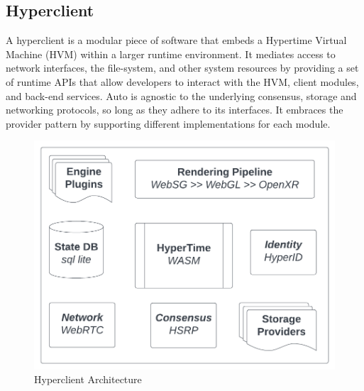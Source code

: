 \documentclass[twocolumn, 10pt]{article}
\begin{document}
\subsection{Hyperclient}

A hyperclient is a modular piece of software that embeds a Hypertime Virtual Machine (HVM) within a larger runtime environment. It mediates access to network interfaces, the file-system, and other system resources by providing a set of runtime APIs that allow developers to interact with the HVM, client modules, and back-end services. Auto is agnostic to the underlying consensus, storage and networking protocols, so long as they adhere to its interfaces. It embraces the provider pattern by supporting different implementations for each module. 

\begin{figure}[h]
    \centering
    \includegraphics{images/hyperclient.png}
    \caption{Hyperclient Architecture}
    \label{fig:my_label}
\end{figure}
\end{document}
